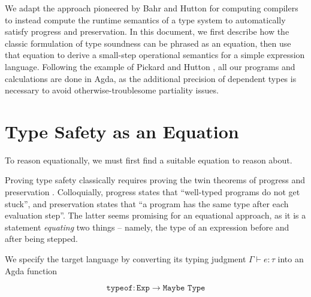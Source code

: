 \documentclass[manuscript,screen,review,sigplan]{acmart}
\begin{document}


We adapt the approach pioneered by Bahr and Hutton \cite{bahr:2015} for
computing compilers to instead compute the runtime semantics of a type system
to automatically satisfy progress and preservation.
In this document, we first describe how the classic formulation of
type soundness can be phrased as an equation, then use that equation to
derive a small-step operational semantics for a simple expression language.
Following the example of Pickard and Hutton \cite{pickard:2021}, all our
programs and calculations are done in Agda, as the additional precision of
dependent types is necessary to avoid otherwise-troublesome partiality issues.

\section{Type Safety as an Equation}

To reason equationally, we must first find a suitable equation to reason about.

Proving type safety classically requires proving the twin theorems of
progress and preservation \cite{harper:pfpl}. Colloquially, progress states
that ``well-typed programs do not get stuck'', and preservation states that
``a program has the same type after each evaluation step''. The latter seems
promising for an equational approach, as it is a statement \emph{equating} two
things -- namely, the type of an expression before and after being stepped.

We specify the target language by converting its typing judgment $\Gamma
\vdash e : \tau$ into an Agda function

\begin{equation*}
  \texttt{typeof} : \texttt{Exp} \rightarrow \texttt{Maybe Type}
\end{equation*}
\end{document}
